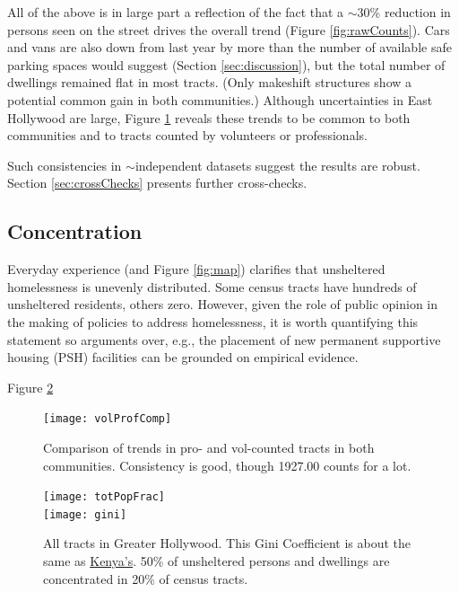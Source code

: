 \documentclass[11pt,twocolumn]{article}
\begin{document}
All of the above is in large part a reflection of the fact that a $\sim$30\% reduction in persons seen 
on the street drives the overall trend (Figure \ref{fig:rawCounts}). Cars and vans are also down from 
last year by more than the number of available safe parking spaces would suggest 
(Section \ref{sec:discussion}), but the total number of dwellings remained flat in most tracts. 
(Only makeshift structures show a potential common gain in both communities.)
Although uncertainties in East Hollywood are large, Figure \ref{fig:proVolComp} reveals these 
trends to be common to both communities and to tracts counted by volunteers or professionals.

Such consistencies in $\sim$independent datasets suggest the results are robust. Section
 \ref{sec:crossChecks} presents further cross-checks.


\subsection{Concentration}
\label{sec:concentration}

Everyday experience (and Figure \ref{fig:map}) clarifies that unsheltered homelessness is
unevenly distributed. Some census tracts have hundreds of unsheltered residents, others zero.
However, given the role of public opinion in the making of policies to address homelessness,
it is worth quantifying this statement so arguments over, e.g., the placement of new permanent
supportive housing (PSH) facilities can be grounded on empirical evidence.

Figure \ref{fig:gini}

\begin{figure}[t]
	\centering
	\texttt{[image: volProfComp]}
	\caption{Comparison of trends in pro- and vol-counted tracts in both communities.
			Consistency is good, though 1927.00 counts for a lot.}
	\label{fig:proVolComp}
\end{figure}

\begin{figure}[t]
	\centering
	\texttt{[image: totPopFrac]}\\
	\texttt{[image: gini]}
	\caption{All tracts in Greater Hollywood. This Gini Coefficient
			is about the same as 
			\href{https://en.wikipedia.org/wiki/List_of_countries_by_income_equality}{Kenya's}.
			50\% of unsheltered persons and dwellings are concentrated in 20\% of census
			tracts.}
	\label{fig:gini}
\end{figure}
\end{document}
